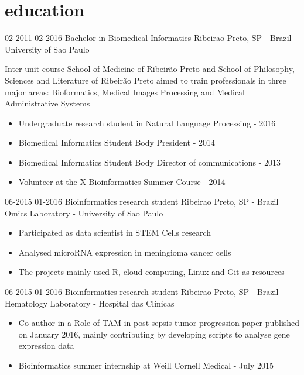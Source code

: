 \documentclass[]{friggeri-cv}
\begin{document}
\section{education}

\begin{entrylist}
  \entrysecondtype
    {02-2011 02-2016}
    {Bachelor in Biomedical Informatics}
    {Ribeirao Preto, SP - Brazil}
    {University of Sao Paulo}
    {Inter-unit course School of Medicine of Ribeirão Preto and School of Philosophy, Sciences and Literature of Ribeirão Preto aimed to train professionals in three major areas: Bioformatics, Medical Images Processing and Medical Administrative Systems
      \begin{itemize}
        \item Undergraduate research student in Natural Language Processing - 2016
        \item Biomedical Informatics Student Body President - 2014
        \item Biomedical Informatics Student Body Director of communications - 2013
        \item Volunteer at the X Bioinformatics Summer Course - 2014
      \end{itemize}
    }
\end{entrylist}

\begin{entrylist}
  \entrysecondtype
    {06-2015 01-2016}
    {Bioinformatics research student}
    {Ribeirao Preto, SP - Brazil}
    {Omics Laboratory - University of Sao Paulo}
    {\begin{itemize}
        \item Participated as data scientist in STEM Cells research
        \item Analysed microRNA expression in meningioma cancer cells
        \item The projects mainly used R, cloud computing, Linux and Git as resources
      \end{itemize}
    }
  \entrysecondtype
    {06-2015 01-2016}
    {Bioinformatics research student}
    {Ribeirao Preto, SP - Brazil}
    {Hematology Laboratory - Hospital das Clinicas}
    {
      \begin{itemize}
        \item Co-author in a Role of TAM in post-sepsis tumor progression paper published on January 2016, mainly contributing by developing scripts to analyse gene expression data
        \item Bioinformatics summer internship at Weill Cornell Medical - July 2015
      \end{itemize}
    }
\end{entrylist}
\end{document}
